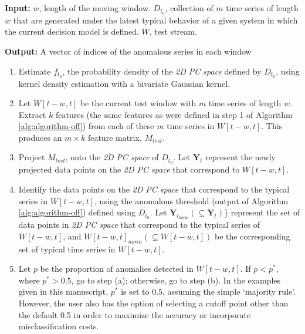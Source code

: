 \documentclass[12pt]{article}
\begin{document}
\textbf{Input:} \(w\), length of the moving window. \(D_{t_{0}}\),
collection of \(m\) time series of length \(w\) that are generated under
the latest typical behavior of a given system in which the current
decision model is defined. \(W\), test stream.

\textbf{Output:} A vector of indices of the anomalous series in each
window \vspace{-0.5em}

\begin{enumerate}
\def\labelenumi{\arabic{enumi}.}
\item
  Estimate \(f_{t_{0}}\), the probability density of the \emph{2D PC
  space} defined by \(D_{t_{0}}\), using kernel density estimation with
  a bivariate Gaussian kernel.
\item
  Let \(W[t-w, t]\) be the current test window with \(m\) time series of
  length \(w\). Extract \(k\) features (the same features as were
  defined in step 1 of Algorithm \ref{alg:algorithm-off}) from each of
  these \(m\) time series in \(W[t-w, t]\). This produces an
  \(m\times k\) feature matrix, \(M_{test}\).
\item
  Project \(M_{test}\), onto the \emph{2D PC space} of \(D_{t_{0}}\).
  Let \(\bm{Y}_{t}\) represent the newly projected data points on the
  \emph{2D PC space} that correspond to \(W[t-w, t]\).
\item
  Identify the data points on the \emph{2D PC space} that correspond to
  the typical series in \(W[t-w, t]\), using the anomalous threshold
  (output of Algorithm \ref{alg:algorithm-off}) defined using
  \(D_{t_{0}}\). Let
  \(\bm{Y}_{t_{\text{norm}}} (\subseteq \bm{Y}_{t})\)\} represent the
  set of data points in \emph{2D PC space} that correspond to the
  typical series of \(W[t-w, t]\), and
  \(W[t-w, t]_{norm} (\subseteq W[t-w, t])\) be the corresponding set of
  typical time series in \(W[t-w, t]\).
\item
  Let \(p\) be the proportion of anomalies detected in \(W[t-w, t]\). If
  \(p < p^{*}\), where \(p^{*} > 0.5\), go to step (a); otherwise, go to
  step (b). In the examples given in this manuscript, \(p^{*}\) is set
  to 0.5, assuming the simple `majority rule'. However, the user also
  has the option of selecting a cutoff point other than the default 0.5
  in order to maximize the accuracy or incorporate misclassification
  costs.
\end{enumerate}

\vspace{-1em}
\end{document}
